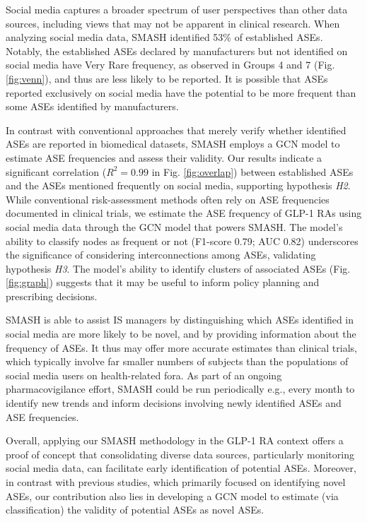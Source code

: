 \documentclass[referee,bst/sn-basic]{sn-jnl}%
\begin{document}
Social media captures a broader spectrum of user perspectives than other data sources, including views that may not be apparent in clinical research.
When analyzing social media data, SMASH identified 53\% of established ASEs.
Notably, the established ASEs declared by manufacturers but not identified on social media have Very Rare frequency, as observed in Groups 4 and 7 (Fig. \ref{fig:venn}), and thus are less likely to be reported. It is possible that ASEs reported exclusively on social media have the potential to be more frequent than some ASEs identified by manufacturers.

In contrast with conventional approaches that merely verify whether identified ASEs are reported in biomedical datasets, SMASH employs a GCN model to estimate ASE frequencies and assess their validity. 
Our results indicate a significant correlation ($R^2=0.99$ in Fig. \ref{fig:overlap}) between established ASEs and the ASEs mentioned frequently on social media, supporting hypothesis \textit{H2}.
While conventional risk-assessment methods often rely on ASE frequencies documented in clinical trials, we estimate the ASE frequency of GLP-1 RAs using social media data through the GCN model that powers SMASH.
The model's ability to classify nodes as frequent or not (F1-score 0.79; AUC 0.82) underscores the significance of considering interconnections among ASEs, validating hypothesis \textit{H3}. 
The model's ability to identify clusters of associated ASEs (Fig. \ref{fig:graph}) suggests that it may be useful to inform policy planning and prescribing decisions.

SMASH is able to assist IS managers by distinguishing which ASEs identified in social media are more likely to be novel, and by providing information about the frequency of ASEs.
It thus may offer more accurate estimates than clinical trials, which typically involve far smaller numbers of subjects than the populations of social media users on health-related fora. 
As part of an ongoing pharmacovigilance effort, SMASH could be run periodically e.g., every month to identify new trends and inform decisions involving newly identified ASEs and ASE frequencies.

Overall, applying our SMASH methodology in the GLP-1 RA context offers a proof of concept that consolidating diverse data sources, particularly monitoring social media data, can facilitate early identification of potential ASEs. 
Moreover, in contrast with previous studies, which primarily focused on identifying novel ASEs, our contribution also lies in developing a GCN model to estimate (via classification) the validity of potential ASEs as novel ASEs.
\end{document}
